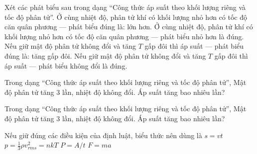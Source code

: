 \begin{ex}
Xét các phát biểu sau trong dạng “Công thức áp suất theo khối lượng riêng và tốc độ phân tử”.
\choiceTF
{\True Ở cùng nhiệt độ, phân tử khí có khối lượng nhỏ hơn có tốc độ căn quân phương — phát biểu đúng là: lớn hơn.}
{Ở cùng nhiệt độ, phân tử khí có khối lượng nhỏ hơn có tốc độ căn quân phương — phát biểu nhỏ hơn là đúng.}
{\True Nếu giữ mật độ phân tử không đổi và tăng $T$ gấp đôi thì áp suất — phát biểu đúng là: tăng gấp đôi.}
{Nếu giữ mật độ phân tử không đổi và tăng $T$ gấp đôi thì áp suất — phát biểu không đổi là đúng.}
\end{ex}

\begin{bt}
Trong dạng “Công thức áp suất theo khối lượng riêng và tốc độ phân tử”, Mật độ phân tử tăng 3 lần, nhiệt độ không đổi. Áp suất tăng bao nhiêu lần?
\end{bt}

\begin{ex}
Trong dạng “Công thức áp suất theo khối lượng riêng và tốc độ phân tử”, Mật độ phân tử tăng 3 lần, nhiệt độ không đổi. Áp suất tăng bao nhiêu lần?
\end{ex}

\begin{ex}
Nếu giữ đúng các điều kiện của định luật, biểu thức nên dùng là
\choice
{$s=vt$}
{\True $p=\frac13\rho v_{rms}^2=nkT$}
{$P=A/t$}
{$F=ma$}
\end{ex}

